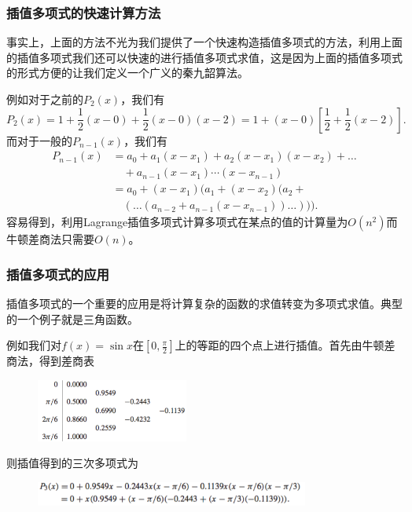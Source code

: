 \documentclass[10pt]{beamer}
\begin{document}
\begin{frame}
\frametitle{插值多项式的快速计算方法}
事实上，上面的方法不光为我们提供了一个快速构造插值多项式的方法，利用上面的插值多项式我们还可以快速的进行插值多项式求值，这是因为上面的插值多项式的形式方便的让我们定义一个广义的秦九韶算法。

\vspace{0.2cm}

例如对于之前的$P_2(x)$，我们有
\begin{equation}
P_2(x) = 1 + \frac{1}{2}(x-0) + \frac{1}{2}(x-0)(x-2) = 1 + (x-0)[\frac{1}{2} + \frac{1}{2}(x-2)].
\end{equation}
而对于一般的$P_{n-1}(x)$，我们有
\begin{align}
P_{n-1}(x) & = a_0 + a_1(x - x_1) + a_2(x - x_1)(x-x_2)+ \ldots \nonumber \\
                 &\quad + a_{n-1}(x - x_1) \cdots (x - x_{n-1}) \nonumber \\
                 & = a_0 + (x-x_1)(a_1 + (x-x_2)(a_2 +\nonumber \\
                 & \quad  (\ldots (a_{n-2} + a_{n-1}(x-x_{n-1})) \ldots ))).
\end{align}
容易得到，利用Lagrange插值多项式计算多项式在某点的值的计算量为$O(n^2)$而牛顿差商法只需要$O(n)$。
\end{frame}


\begin{frame}
\frametitle{插值多项式的应用}
插值多项式的一个重要的应用是将计算复杂的函数的求值转变为多项式求值。典型的一个例子就是三角函数。

\vspace{0.2cm}

例如我们对$f(x) = \sin x$在$[0,\frac{\pi}{2}]$上的等距的四个点上进行插值。首先由牛顿差商法，得到差商表
\begin{figure}
\includegraphics[width=5cm]{figs/3-1-5_sin-1} 
\end{figure}
则插值得到的三次多项式为
\begin{figure}
\includegraphics[width=9cm]{figs/3-1-5_sin-2} 
\end{figure}
\end{frame}
\end{document}
